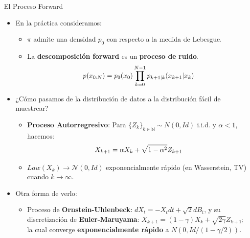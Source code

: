 \documentclass[aspectratio=169,xcolor=dvipsnames, t, spanish]{beamer}
\begin{document}
    \begin{frame}{El Proceso Forward}
        \begin{itemize}
            \item En la práctica consideramos:
            \begin{itemize}
                \item $\pi$ admite una densidad $p_{0}$ con respecto a la medida de Lebesgue.
                \item La \textbf{descomposición forward} es un \textbf{proceso de ruido}.\vspace{-2mm}
                \[ p(x_{0:N})=p_{0}(x_{0})\prod_{k=0}^{N-1}p_{k+1|k}(x_{k+1}|x_{k}) \vspace{-2mm}\]
            \end{itemize}
            \pause
            \item ¿Cómo pasamos de la distribución de datos a la distribución fácil de muestrear?
            \begin{itemize}
                \item \textbf{Proceso Autorregresivo}: Para $\{Z_{k}\}_{k\in\mathbb{N}} \sim N(0,Id)$ i.i.d. y $\alpha<1$, hacemos:\vspace{-1mm} \[X_{k+1}=\alpha X_{k}+\sqrt{1-\alpha^{2}}Z_{k+1}\vspace{-1mm}\]
                \item $Law(X_{k})\rightarrow\mathcal{N}(0,Id)$ exponencialmente rápido (en Wasserstein, TV) cuando $k\rightarrow\infty$.
            \end{itemize}
            \pause
            \item Otra forma de verlo:
            \begin{itemize}
                \item Proceso de \textbf{Ornstein-Uhlenbeck}: $dX_{t}=-X_{t}dt+\sqrt{2}dB_{t}$, y su discretización de \textbf{Euler-Maruyama}: $X_{k+1}=(1-\gamma)X_{k}+\sqrt{2\gamma}Z_{k+1}$; la cual converge \textbf{exponencialmente rápido} a $N(0, Id/(1-\gamma/2))$.
            \end{itemize}
        \end{itemize}
    \end{frame}
    
\end{document}
